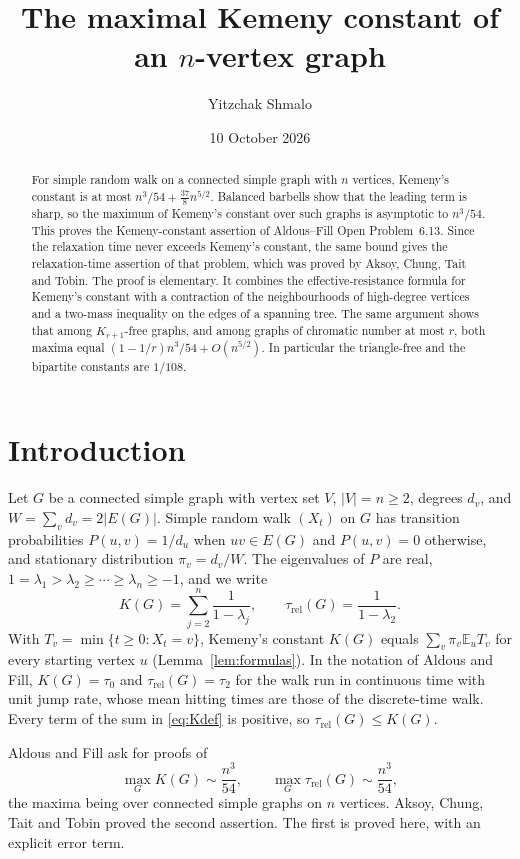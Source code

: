 \documentclass[11pt]{amsart}
\title[The maximal Kemeny constant]{The maximal Kemeny constant of an $n$-vertex graph}
\author{Yitzchak Shmalo}
\date{10 October 2026}
\numberwithin{equation}{section}
\theoremstyle{remark}
\newcommand{\E}{\mathbb E}
\newcommand{\trel}{\tau_{\mathrm{rel}}}
\begin{document}
\begin{abstract}
For simple random walk on a connected simple graph with $n$ vertices, Kemeny's constant is at most $n^3/54+\frac{37}{8}n^{5/2}$. Balanced barbells show that the leading term is sharp, so the maximum of Kemeny's constant over such graphs is asymptotic to $n^3/54$. This proves the Kemeny-constant assertion of Aldous--Fill Open Problem~6.13. Since the relaxation time never exceeds Kemeny's constant, the same bound gives the relaxation-time assertion of that problem, which was proved by Aksoy, Chung, Tait and Tobin. The proof is elementary. It combines the effective-resistance formula for Kemeny's constant with a contraction of the neighbourhoods of high-degree vertices and a two-mass inequality on the edges of a spanning tree. The same argument shows that among $K_{r+1}$-free graphs, and among graphs of chromatic number at most $r$, both maxima equal $(1-1/r)n^3/54+O(n^{5/2})$. In particular the triangle-free and the bipartite constants are $1/108$.
\end{abstract}
\maketitle

\section{Introduction}\label{sec:intro}
Let $G$ be a connected simple graph with vertex set $V$, $|V|=n\ge2$, degrees $d_v$, and $W=\sum_vd_v=2|E(G)|$. Simple random walk $(X_t)$ on $G$ has transition probabilities $P(u,v)=1/d_u$ when $uv\in E(G)$ and $P(u,v)=0$ otherwise, and stationary distribution $\pi_v=d_v/W$. The eigenvalues of $P$ are real, $1=\lambda_1>\lambda_2\ge\cdots\ge\lambda_n\ge-1$, and we write
\begin{equation}\label{eq:Kdef}
K(G)=\sum_{j=2}^n\frac1{1-\lambda_j},\qquad \trel(G)=\frac1{1-\lambda_2}.
\end{equation}
With $T_v=\min\{t\ge0:X_t=v\}$, Kemeny's constant $K(G)$ equals $\sum_v\pi_v\E_uT_v$ for every starting vertex $u$ (Lemma~\ref{lem:formulas}). In the notation of Aldous and Fill, $K(G)=\tau_0$ and $\trel(G)=\tau_2$ for the walk run in continuous time with unit jump rate, whose mean hitting times are those of the discrete-time walk. Every term of the sum in \eqref{eq:Kdef} is positive, so $\trel(G)\le K(G)$.

Aldous and Fill \cite[Chapter~6, Open Problem~6.13]{AF} ask for proofs of
\begin{equation}\label{eq:AF}
\max_GK(G)\sim\frac{n^3}{54},\qquad \max_G\trel(G)\sim\frac{n^3}{54},
\end{equation}
the maxima being over connected simple graphs on $n$ vertices. Aksoy, Chung, Tait and Tobin \cite{ACTT} proved the second assertion. The first is proved here, with an explicit error term.
\end{document}
